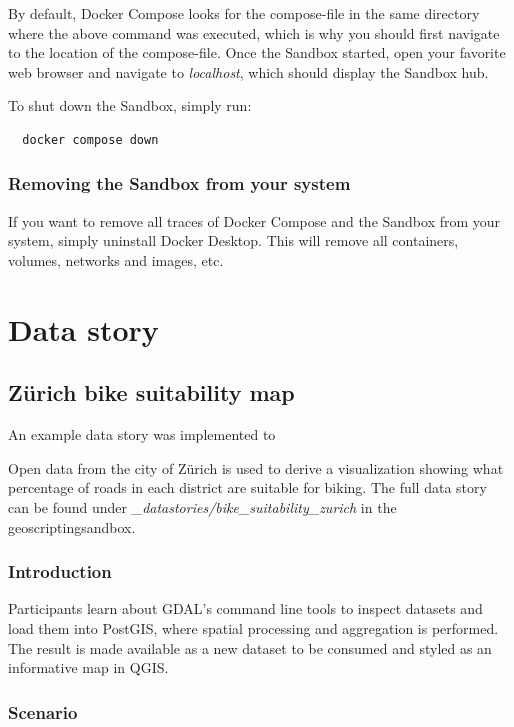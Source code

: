 \documentclass[11pt, a4paper, oneside, parskip=full-]{scrartcl}
\begin{document}
By default, Docker Compose looks for the compose-file in the same directory
where the above command was executed, which is why you should first navigate to
the location of the compose-file. Once the Sandbox started, open your favorite
web browser and navigate to \emph{localhost}, which should display the Sandbox
hub.

To shut down the Sandbox, simply run:
\begin{lstlisting}
  docker compose down
\end{lstlisting}

\subsubsection*{Removing the Sandbox from your system}
If you want to remove all traces of Docker Compose and the Sandbox from your
system, simply uninstall Docker Desktop. This will remove all containers,
volumes, networks and images, etc.

\section{Data story}

\subsection{Zürich bike suitability map}
An example data story was implemented to

Open data from the city of Zürich is used to derive a visualization showing what
percentage of roads in each district are suitable for biking. The full data
story can be found under \emph{\_datastories/bike\_suitability\_zurich} in the
geoscriptingsandbox.

\subsubsection*{Introduction}

Participants learn about GDAL's command line tools to inspect datasets and load
them into PostGIS, where spatial processing and aggregation is performed. The
result is made available as a new dataset to be consumed and styled as an
informative map in QGIS.

\subsubsection*{Scenario}
\end{document}
